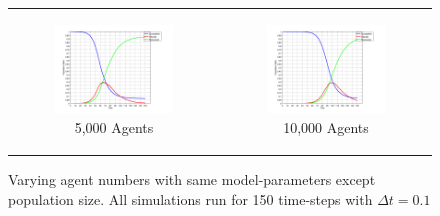 \begin{figure}
\begin{center}
\begin{tabular}{c c}
    	\\
    	
		\begin{subfigure}[b]{0.3\textwidth}
			\centering
			\includegraphics[width=1\textwidth, angle=0]{./../shared/fig/frabs/SIR_5000agents_150t_01dt_NOSS_parallel.png}
			\caption{5,000 Agents}
			\label{fig:sir_abs_approximating_5000}
		\end{subfigure}
		& 
		\begin{subfigure}[b]{0.3\textwidth}
			\centering
			\includegraphics[width=1\textwidth, angle=0]{./../shared/fig/frabs/SIR_10000agents_150t_01dt_NOSS_parallel.png}
			\caption{10,000 Agents}
			\label{fig:sir_abs_approximating_10000}
		\end{subfigure}
	\end{tabular}
	
	\caption{Varying agent numbers with same model-parameters except population size. All simulations run for 150 time-steps with $\Delta t = 0.1$}
	\label{fig:sir_abs_approximating}
\end{center}
\end{figure}


